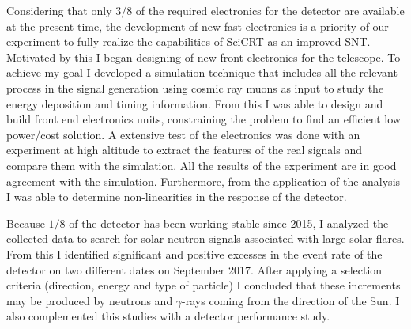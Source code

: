 Considering that only $3/8$ of the required electronics for the detector are available at the present time, the development of new fast electronics is a priority of our experiment to fully realize the capabilities of SciCRT as an improved SNT. Motivated by this I began designing of new front electronics for the telescope. To achieve my goal I developed a simulation technique that includes all the relevant process in the signal generation using cosmic ray muons as input to study the energy deposition and timing information. From this I was able to design and build front end electronics units, constraining the problem to find an efficient low power/cost solution. A extensive test of the electronics was done with an experiment at high altitude to extract the features of the real signals and compare them with the simulation. All the results of the experiment are in good agreement with the simulation. Furthermore, from the application of the analysis I was able to determine non-linearities in the response of the detector.

Because $1/8$ of the detector has been working stable since \num{2015}, I analyzed the collected data to search for solar neutron signals associated with large solar flares. From this I identified significant and positive excesses in the event rate of the detector on two different dates on September \num{2017}. After applying a selection criteria (direction, energy and type of particle) I concluded that these increments may be produced by neutrons and $\gamma$-rays coming from the direction of the Sun. I also complemented this studies with a detector performance study.
